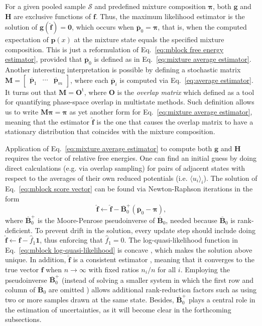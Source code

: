 \documentclass[journal=jctcce,manuscript=article,layout=twocolumn]{achemso}
\newcommand{\mt}[1]{\boldsymbol{\mathbf{#1}}}   %
\newcommand{\vt}[1]{\boldsymbol{\mathbf{#1}}}   %
\newcommand{\tr}[1]{#1^\text{t}}                %
\newcommand{\avg}[1]{\overline{#1}}             %
\begin{document}
For a given pooled sample $\mathcal S$ and predefined mixture composition $\vt \pi$, both $\vt g$ and $\mt H$ are exclusive functions of $\vt f$. Thus, the maximum likelihood estimator is the solution of $\vt g(\hat{\vt f}) = \vt 0$, which occurs when $\avg{\vt p}_0 = \vt \pi$, that is, when the computed expectation of $\vt p(x)$ at the mixture state equals the specified mixture composition. This is just a reformulation of Eq.~\eqref{eq:mblock free energy estimator}, provided that $\avg{\vt p}_0$ is defined as in Eq.~\eqref{eq:mixture average estimator}. Another interesting interpretation is possible by defining a stochastic matrix $\mt M = [\begin{array}{ccc} \avg{\vt p}_1 & \cdots & \avg{\vt p}_m \end{array}]$, where each $\avg{\vt p}_i$ is computed via Eq.~\eqref{eq:average estimator}. It turns out that $\mt M = \tr{\mt O}$, where $\mt O$ is the \textit{overlap matrix} which \citeauthor{Klimovich_2015} \cite{Klimovich_2015} defined as a tool for quantifying phase-space overlap in multistate methods. Such definition allows us to write $\mt M \vt \pi = \vt \pi$ as yet another form for Eq.~\eqref{eq:mixture average estimator}, meaning that the estimator $\hat{\vt f}$ is the one that causes the overlap matrix to have a stationary distribution that coincides with the mixture composition.

Application of Eq.~\eqref{eq:mixture average estimator} to compute both $\vt g$ and $\mt H$ requires the vector of relative free energies. One can find an initial guess by doing direct calculations (e.g. via overlap sampling\cite{Lee_1980, Lu_2003}) for pairs of adjacent states with respect to the averages of their own reduced potentials (i.e. $\langle u_i \rangle_i$). The solution of Eq.~\eqref{eq:mblock score vector} can be found via Newton-Raphson iterations in the form
\begin{equation*}
\label{eq:mics Newton-Raphson}
\hat{\vt f} \leftarrow \hat{\vt f} - \avg{\mt B}_0^+ (\avg{\vt p}_0 - {\vt \pi}),
\end{equation*}
where $\avg{\mt B}_0^+ $ is the Moore-Penrose pseudoinverse of $\avg{\mt B}_0$, needed because $\avg{\mt B}_0$ is rank-deficient. To prevent drift in the solution, every update step should include doing $\hat{\vt f} \leftarrow \hat{\vt f} - \hat{f}_1 {\vt 1}$, thus enforcing that $\hat f_1 = 0$. The log-quasi-likelihood function in Eq.~\eqref{eq:mblock log-quasi-likelihood} is concave \cite{Doss_2014}, which makes the solution above unique. In addition, $\hat{\vt f}$ is a consistent estimator \cite{Doss_2014}, meaning that it converges to the true vector $\vt f$ when $n \rightarrow \infty$ with fixed ratios $n_i/n$ for all $i$. Employing the pseudoinverse $\avg{\mt B}_0^+ $ (instead of solving a smaller system in which the first row and column of $\avg{\mt B}_0$ are omitted \cite{Shirts_2008}) allows additional rank-reduction factors such as using two or more samples drawn at the same state. Besides, $\avg{\mt B}_0^+ $ plays a central role in the estimation of uncertainties, as it will become clear in the forthcoming subsections.
\end{document}
